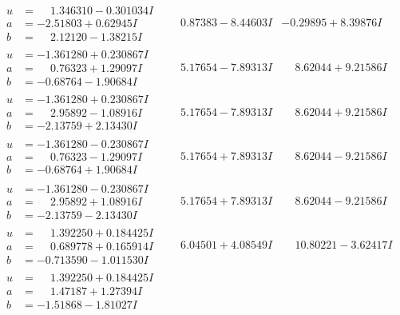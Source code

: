 \documentclass[1p]{elsarticle_modified}
\theoremstyle{definition}
\begin{document}
$$\begin{array}{c|c|c}
\begin{aligned}
u &= \phantom{-}1.346310 - 0.301034 I \\
a &= -2.51803 + 0.62945 I \\
b &= \phantom{-}2.12120 - 1.38215 I\end{aligned}
 & \phantom{-}0.87383 - 8.44603 I & -0.29895 + 8.39876 I \\ \hline\begin{aligned}
u &= -1.361280 + 0.230867 I \\
a &= \phantom{-}0.76323 + 1.29097 I \\
b &= -0.68764 - 1.90684 I\end{aligned}
 & \phantom{-}5.17654 - 7.89313 I & \phantom{-}8.62044 + 9.21586 I \\ \hline\begin{aligned}
u &= -1.361280 + 0.230867 I \\
a &= \phantom{-}2.95892 - 1.08916 I \\
b &= -2.13759 + 2.13430 I\end{aligned}
 & \phantom{-}5.17654 - 7.89313 I & \phantom{-}8.62044 + 9.21586 I \\ \hline\begin{aligned}
u &= -1.361280 - 0.230867 I \\
a &= \phantom{-}0.76323 - 1.29097 I \\
b &= -0.68764 + 1.90684 I\end{aligned}
 & \phantom{-}5.17654 + 7.89313 I & \phantom{-}8.62044 - 9.21586 I \\ \hline\begin{aligned}
u &= -1.361280 - 0.230867 I \\
a &= \phantom{-}2.95892 + 1.08916 I \\
b &= -2.13759 - 2.13430 I\end{aligned}
 & \phantom{-}5.17654 + 7.89313 I & \phantom{-}8.62044 - 9.21586 I \\ \hline\begin{aligned}
u &= \phantom{-}1.392250 + 0.184425 I \\
a &= \phantom{-}0.689778 + 0.165914 I \\
b &= -0.713590 - 1.011530 I\end{aligned}
 & \phantom{-}6.04501 + 4.08549 I & \phantom{-}10.80221 - 3.62417 I \\ \hline\begin{aligned}
u &= \phantom{-}1.392250 + 0.184425 I \\
a &= \phantom{-}1.47187 + 1.27394 I \\
b &= -1.51868 - 1.81027 I\end{aligned}

\end{array}$$
\end{document}
